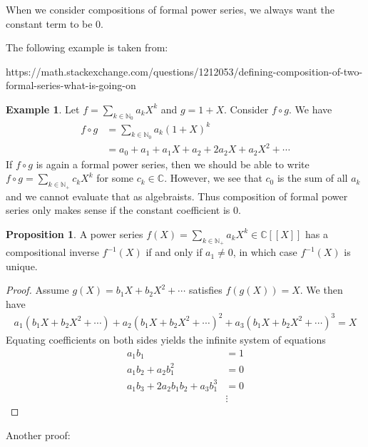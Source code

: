\documentclass[a4paper]{article}
\theoremstyle{definition}
\newtheorem{example}{Example}[definition]
\newtheorem{proposition}[definition]{Proposition}
\begin{document}
When we consider compositions of formal power series, we always want the constant term to be \(0\).

The following example is taken from:

https://math.stackexchange.com/questions/1212053/defining-composition-of-two-formal-series-what-is-going-on

\begin{example}
    Let \(f = \sum_{k \in \mathbb{N}_0} a_k X^k\) and \(g = 1 + X\). Consider \(f \circ g\). We have
    \begin{align*}
        f \circ g &= \sum_{k \in \mathbb{N}_0} a_k (1 + X)^k \\
        &= a_0 + a_1 + a_1 X + a_2 + 2 a_2 X + a_2 X^2 + \cdots
    \end{align*}
    If \(f \circ g\) is again a formal power series, then we should be able to write \(f \circ g = \sum_{k \in \mathbb{N}_+} c_k X^k\) for some \(c_k \in \mathbb{C}\). However, we see that \(c_0\) is the sum of all \(a_k\) and we cannot evaluate that as algebraists. Thus composition of formal power series only makes sense if the constant coefficient is \(0\).
\end{example}

\begin{proposition}
    A power series \(f(X) = \sum_{k \in \mathbb{N}_+} a_k X^k \in \mathbb{C}[[X]]\) has a compositional inverse \(f^{-1}(X)\) if and only if \(a_1 \neq 0\), in which case \(f^{-1}(X)\) is unique.
\end{proposition}

\begin{proof}
    Assume \(g(X) = b_1 X + b_2 X^2 + \cdots\) satisfies \(f(g(X)) = X\). We then have
    \begin{align*}
        a_1(b_1 X + b_2 X^2 + \cdots) + a_2(b_1 X + b_2 X^2 + \cdots)^2 + a_3(b_1 X + b_2 X^2 + \cdots)^3 = X
    \end{align*}
    Equating coefficients on both sides yields the infinite system of equations
    \begin{align*}
        a_1 b_1 &= 1 \\
        a_1 b_2 + a_2 b_1^2 &= 0 \\
        a_1 b_3 + 2a_2 b_1 b_2 + a_3 b_1^3 &= 0 \\
        &\vdots
    \end{align*}
\end{proof}
Another proof:
\end{document}
